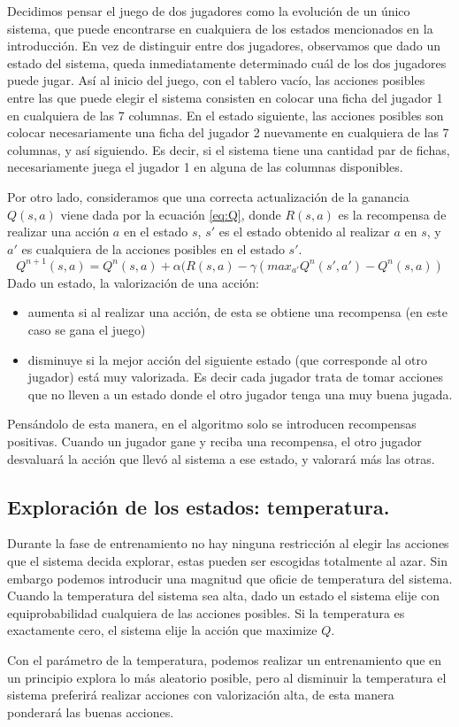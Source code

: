 \documentclass[11pt, spanish]{article}
\begin{document}
\par Decidimos pensar el juego de dos jugadores como la evolución de un único sistema, que puede encontrarse en cualquiera de los estados mencionados en la introducción. En vez de distinguir entre dos jugadores, observamos que dado un estado del sistema, queda inmediatamente determinado cuál de los dos jugadores puede jugar. Así al inicio del juego, con el tablero vacío, las acciones posibles entre las que puede elegir el sistema consisten en colocar una ficha del jugador 1 en cualquiera de las 7 columnas. En el estado siguiente, las acciones posibles son colocar necesariamente una ficha del jugador 2 nuevamente en cualquiera de las 7 columnas, y así siguiendo. Es decir, si el sistema tiene una cantidad par de fichas, necesariamente juega el jugador 1 en alguna de las columnas disponibles.
\par Por otro lado, consideramos que una correcta actualización de la ganancia $Q(s,a)$ viene dada por la ecuación \ref{eq:Q}, donde $R(s,a)$ es la recompensa de realizar una acción $a$ en el estado $s$, $s'$ es el estado obtenido al realizar $a$ en $s$, y $a'$ es cualquiera de la acciones posibles en el estado $s'$.
\begin{equation}
Q^{n+1}(s,a) = Q^{n}(s,a) + \alpha (R(s,a) - \gamma (max_{a'}Q^n(s',a') - Q^n(s,a))
\label{eq:Q}
\end{equation} 
Dado un estado, la valorización de una acción:
\begin{itemize}
\item aumenta si al realizar una acción, de esta se obtiene una recompensa (en este caso se gana el juego)
\item disminuye si la mejor acción del siguiente estado (que corresponde al otro jugador) está muy valorizada. Es decir cada jugador trata de tomar acciones que no lleven a un estado donde el otro jugador tenga una muy buena jugada.
\end{itemize}
Pensándolo de esta manera, en el algoritmo solo se introducen recompensas positivas. Cuando un jugador gane y reciba una recompensa, el otro jugador desvaluará la acción que llevó al sistema a ese estado, y valorará más las otras.

\subsection{Exploración de los estados: temperatura.}

\par Durante la fase de entrenamiento no hay ninguna restricción al elegir las acciones que el sistema decida explorar, estas pueden ser escogidas totalmente al azar. Sin embargo podemos introducir una magnitud que oficie de temperatura del sistema. Cuando la temperatura del sistema sea alta, dado un estado el sistema elije con equiprobabilidad cualquiera de las acciones posibles. Si la temperatura es exactamente cero, el sistema elije la acción que maximize $Q$.
\par Con el parámetro de la temperatura, podemos realizar un entrenamiento que en un principio explora lo más aleatorio posible, pero al disminuir la temperatura el sistema preferirá realizar acciones con valorización alta, de esta manera ponderará las buenas acciones.
\end{document}
